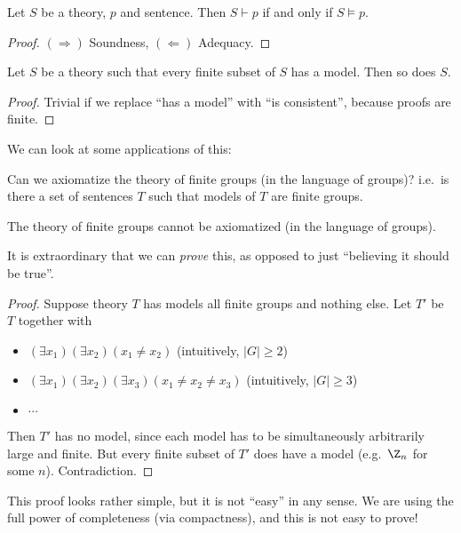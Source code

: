 \documentclass[a4paper]{article}
\begin{document}
\begin{thm}
  Let $S$ be a theory, $p$ and sentence. Then $S\vdash p$ if and only if $S \models p$.
\end{thm}

\begin{proof}
  $(\Rightarrow)$ Soundness, $(\Leftarrow)$ Adequacy.
\end{proof}

\begin{cor}
  Let $S$ be a theory such that every finite subset of $S$ has a model. Then so does $S$.
\end{cor}

\begin{proof}
  Trivial if we replace ``has a model'' with ``is consistent'', because proofs are finite.
\end{proof}

We can look at some applications of this:

Can we axiomatize the theory of finite groups (in the language of groups)? i.e.\ is there a set of sentences $T$ such that models of $T$ are finite groups.

\begin{cor}
  The theory of finite groups cannot be axiomatized (in the language of groups).
\end{cor}
It is extraordinary that we can \emph{prove} this, as opposed to just ``believing it should be true''.

\begin{proof}
  Suppose theory $T$ has models all finite groups and nothing else. Let $T'$ be $T$ together with
  \begin{itemize}
    \item $(\exists x_1)(\exists x_2)(x_1 \not = x_2)$ (intuitively, $|G| \geq 2$)
    \item $(\exists x_1)(\exists x_2)(\exists x_3)(x_1 \not= x_2 \not= x_3)$ (intuitively, $|G| \geq 3$)
    \item $\cdots$
  \end{itemize}
  Then $T'$ has no model, since each model has to be simultaneously arbitrarily large and finite. But every finite subset of $T'$ does have a model (e.g.\ $\Z_n$ for some $n$). Contradiction.
\end{proof}
This proof looks rather simple, but it is not ``easy'' in any sense. We are using the full power of completeness (via compactness), and this is not easy to prove!
\end{document}

